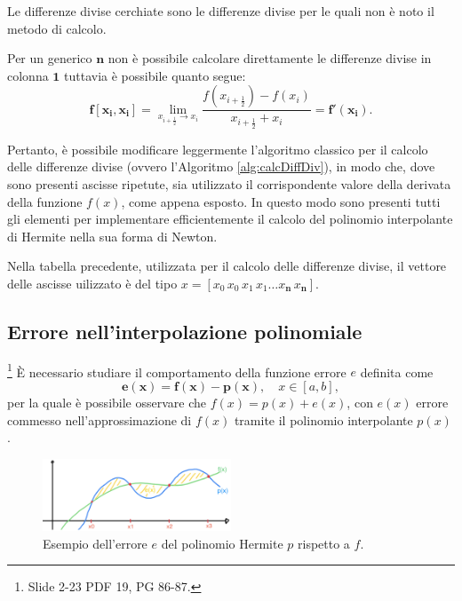 \begin{example}
    Le differenze divise cerchiate sono le differenze divise per le quali non è noto il metodo di calcolo. 
    
    Per un generico $\boldsymbol n$ non è possibile calcolare direttamente le differenze divise in colonna $\boldsymbol{1}$  tuttavia è possibile quanto segue:
    \begin{equation*}
        \boldsymbol{f[x_i,x_i]}=\lim_{x_{i+\frac{1}{2}}\to x_i}\frac{f\left(x_{i+\frac{1}{2}}\right)-f(x_i)}{x_{i+\frac{1}{2}}+x_i}=\boldsymbol{f'(x_i)}.
    \end{equation*}
\end{example}

Pertanto, è possibile modificare leggermente l'algoritmo classico per il calcolo delle differenze divise (ovvero l'Algoritmo \ref{alg:calcDiffDiv}), in modo che, dove sono presenti ascisse ripetute, sia utilizzato il corrispondente valore della derivata della funzione $f(x)$, come appena esposto. In questo modo sono presenti tutti gli elementi per implementare efficientemente il calcolo del polinomio interpolante di Hermite nella sua forma di Newton.

\begin{remark}
    Nella tabella precedente, utilizzata per il calcolo delle differenze divise, il vettore delle ascisse uilizzato è del tipo $x=[x_0\, x_0\, x_1\, x_1 \hdots x_{\boldsymbol n}\, x_{\boldsymbol n}].$
\end{remark}

\subsection{Errore nell'interpolazione polinomiale}\label{ssec:errInter}\footnote{Slide 2-23 PDF 19, PG 86-87.}
È necessario studiare il comportamento della funzione errore $e$ definita come
\begin{equation}\label{eq:defErrInter}
    \boldsymbol{e(x)=f(x)-p(x)},\quad x\in [a,b],
\end{equation}
per la quale è possibile osservare che $f(x)=p(x)+e(x)$, con $e(x)$ errore commesso nell'approssimazione di $f(x)$ tramite il polinomio interpolante $p(x)$.

\begin{figure}
    \centering
    \includegraphics[width=0.5\textwidth]{immagini/ErrorePolinomioHermite.png}
    \caption{Esempio dell'errore $e$ del polinomio Hermite $p$ rispetto a $f$.}
    \label{fig:errPolHer}
\end{figure}
 
